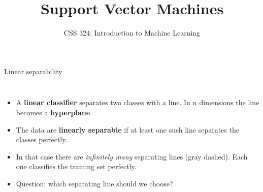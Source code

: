 \documentclass[aspectratio=169,10pt]{beamer}
\title{Support Vector Machines}
\subtitle{CSS 324: Introduction to Machine Learning}
\author{}
\date{}
\newcommand{\axes}{%
  \draw[->,gray] (-0.2,0) -- (6.3,0) node[below] {\scriptsize $x_1$};
  \draw[->,gray] (0,-0.2) -- (0,6.3) node[left] {\scriptsize $x_2$};
}
\newcommand{\posdata}{%
  \foreach \p in {(3,3),(4,2),(5,4),(4.5,3),(3.5,4.5),(5.5,2.2)} \node[ptpos] at \p {};
}
\newcommand{\negdata}{%
  \foreach \p in {(1,1),(0.5,1.5),(0.4,0.6),(1.2,0.3),(0.2,1.2)} \node[ptneg] at \p {};
}
\begin{document}
\maketitle

\begin{frame}{Linear separability}
\begin{columns}[c]
\centering
{}
\begin{itemize}
  \item A \textbf{linear classifier} separates two classes with a line. In $n$ dimensions the line becomes a \textbf{hyperplane}.
  \item The data are \textbf{linearly separable} if at least one such line separates the classes perfectly.
  \item In that case there are \emph{infinitely many} separating lines (gray dashed). Each one classifies the training set perfectly.
  \item \alert{Question:} which separating line should we choose?
\end{itemize}
\end{columns}
\end{frame}
\end{document}
